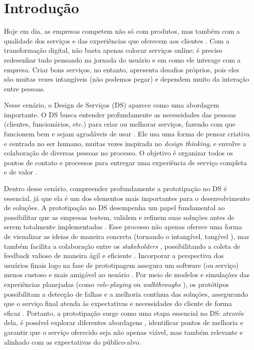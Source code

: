 \chapter[Introdução]{Introdução}


Hoje em dia, as empresas competem não só com produtos, mas também com a qualidade dos serviços e das experiências que oferecem aos clientes \cite{PineGilmore1999MuseumNews}. Com a transformação digital, não basta apenas colocar serviços online; é preciso redesenhar tudo pensando na jornada do usuário e em como ele interage com a empresa. Criar bons serviços, no entanto, apresenta desafios próprios, pois eles são muitas vezes intangíveis (não podemos pegar) e dependem muito da interação entre pessoas.

Nesse cenário, o Design de Serviços (DS) aparece como uma abordagem importante. O DS busca entender profundamente as necessidades das pessoas (clientes, funcionários, etc.) para criar ou melhorar serviços, fazendo com que funcionem bem e sejam agradáveis de usar \cite{Stickdorn2019}. Ele usa uma forma de pensar criativa e centrada no ser humano, muitas vezes inspirada no \textit{design thinking}, e envolve a colaboração de diversas pessoas no processo. O objetivo é organizar todos os pontos de contato e processos para entregar uma experiência de serviço completa e de valor \cite{Polaine2013Orange, Mager2009Emerging}.

Dentro desse cenário, compreender profundamente a prototipação no DS é essencial, já que ela é um dos elementos mais importantes para o desenvolvimento de soluções. A prototipação no DS desempenha um papel fundamental ao possibilitar que as empresas testem, validem e refinem suas soluções antes de serem totalmente implementadas \cite{paust2025integrative}. Esse processo não apenas oferece uma forma de visualizar as ideias de maneira concreta (tornando o intangível, tangível \cite{soto2023prototyping, mager2023product}), mas também facilita a colaboração entre os \textit{stakeholders} \cite{paust2025integrative}, possibilitando a coleta de feedback valioso de maneira ágil e eficiente \cite{asbjornsen2022echange}. Incorporar a perspectiva dos usuários finais logo na fase de prototipagem assegura um software (ou serviço) menos custoso e mais amigável ao usuário \cite{Mattjus2023, villa2022integratedcare}. Por meio de modelos e simulações das experiências planejadas (como \textit{role-playing} ou \textit{walkthroughs} \cite{seko2024transitions, soto2023prototyping}), os protótipos possibilitam a detecção de falhas e a melhoria contínua das soluções, assegurando que o serviço final atenda às expectativas e necessidades do cliente de forma eficaz \cite{kumar2023rheumatology}. Portanto, a prototipação surge como uma etapa essencial no DS: através dela, é possível explorar diferentes abordagens \cite{paust2025integrative}, identificar pontos de melhoria e garantir que o serviço oferecido seja não apenas viável, mas também relevante e alinhado com as expectativas do público-alvo.

